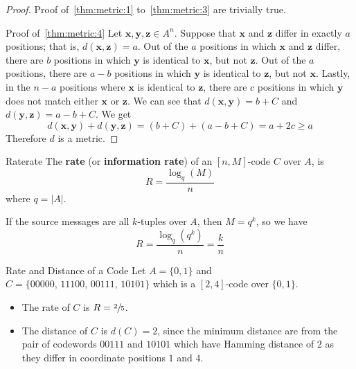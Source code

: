 \begin{proof}

    Proof of~\ref{thm:metric:1} to~\ref{thm:metric:3} are trivially true.

    Proof of~\ref{thm:metric:4} Let $ \bm{x},\bm{y},\bm{z}\in A^n $. Suppose that $ \bm{x} $
    and $ \bm{z} $ differ in exactly $ a $ positions; that is, $ d(\bm{x},\bm{z})=a $.
    Out of the $ a $ positions in which $ \bm{x} $ and $ \bm{z} $ differ,
    there are $ b $ positions in which $ \bm{y} $ is identical to
    $ \bm{x} $, but not $ \bm{z} $. Out of the $ a $ positions,
    there are $ a-b $ positions in which $ \bm{y} $ is identical to
    $ \bm{z} $, but not $ \bm{x} $. Lastly, in the $ n-a $ positions
    where $ \bm{x} $ is identical to $ \bm{z} $, there are $ c $
    positions in which $ \bm{y} $ does not match either
    $ \bm{x} $ or $ \bm{z} $. We can see that
    $ d(\bm{x},\bm{y})=b+C $ and $ d(\bm{y},\bm{z})=a-b+C $. We get
    \[ d(\bm{x},\bm{y})+d(\bm{y},\bm{z})=(b+C) + (a-b+C)=a+2c\geqslant a \]
    Therefore $ d $ is a metric.
\end{proof}

\begin{Definition}{Rate}{rate}
    The \textbf{rate} (or \textbf{information rate}) of an $ [n,M] $-code $ C $ over
    $ A $, is
    \[ R=\frac{\log_q(M)}{n} \]
    where $ q=|A| $.

    If the source messages are all $ k $-tuples over $ A $, then $ M=q^k $, so we have
    \[ R=\frac{\log_q(q^k)}{n}=\frac{k}{n}  \]
\end{Definition}

\begin{Example}{Rate and Distance of a Code}{}
    Let $ A=\{0,1\} $ and $ C=\{00000,\,11100,\,00111,\,10101\} $ which is a
    $ [2,4] $-code over $ \{0,1\} $.
    \begin{itemize}
        \item The rate of $ C $ is $ R=\sfrac{2}{5} $.
        \item The distance of $ C $ is $ d(C)=2 $, since the minimum distance
              are from the pair of codewords $ 00111 $ and $ 10101 $ which
              have Hamming distance of $ 2 $ as they differ in coordinate
              positions $ 1 $ and $ 4 $.
    \end{itemize}
\end{Example}
